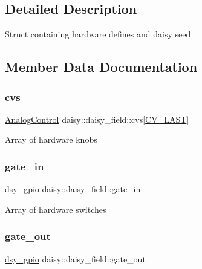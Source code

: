 \subsection{Detailed Description}
Struct containing hardware defines and daisy seed 

\subsection{Member Data Documentation}
\mbox{\label{structdaisy_1_1daisy__field_abc14be5d1126a04a15e5aacca45768f7}} 
\subsubsection{\texorpdfstring{cvs}{cvs}}
{\footnotesize\ttfamily \hyperlink{classdaisy_1_1_analog_control}{Analog\+Control} daisy\+::daisy\+\_\+field\+::cvs\mbox{[}\hyperlink{namespacedaisy_a6be3271bd09db635a6318987eb086c07a085d02d6cdf0f9a6b575f7c9dd3c6813}{C\+V\+\_\+\+L\+A\+ST}\mbox{]}}

Array of hardware knobs \mbox{\label{structdaisy_1_1daisy__field_a0998eb84a118dc2fc8c7e8cf8f84f01d}} 
\subsubsection{\texorpdfstring{gate\+\_\+in}{gate\_in}}
{\footnotesize\ttfamily \hyperlink{structdsy__gpio}{dsy\+\_\+gpio} daisy\+::daisy\+\_\+field\+::gate\+\_\+in}

Array of hardware switches \mbox{\label{structdaisy_1_1daisy__field_af0b4e5553d91f35b328195bba616780a}} 
\subsubsection{\texorpdfstring{gate\+\_\+out}{gate\_out}}
{\footnotesize\ttfamily \hyperlink{structdsy__gpio}{dsy\+\_\+gpio} daisy\+::daisy\+\_\+field\+::gate\+\_\+out}

